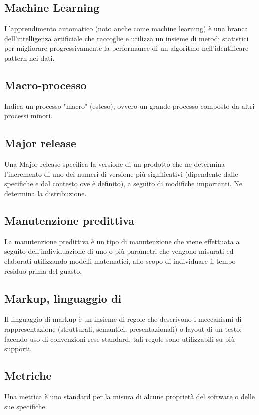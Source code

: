 
\subsection*{Machine Learning}
L’apprendimento automatico (noto anche come machine learning) è una branca dell'intelligenza artificiale che raccoglie e utilizza un insieme di metodi statistici per migliorare progressivamente la performance di un algoritmo nell'identificare pattern nei dati.

\subsection*{Macro-processo}
Indica un processo "macro" (esteso), ovvero un grande processo composto da altri processi minori.

\subsection*{Major release}
Una Major release specifica la versione di un prodotto che ne determina l’incremento di uno dei numeri di versione più significativi (dipendente dalle specifiche e dal contesto ove è definito), a seguito di modifiche importanti. Ne determina la distribuzione.

\subsection*{Manutenzione predittiva}
La manutenzione predittiva è un tipo di manutenzione che viene effettuata a seguito dell'individuazione di uno o più parametri che vengono misurati ed elaborati utilizzando modelli matematici, allo scopo di individuare il tempo residuo prima del guasto.

\subsection*{Markup, linguaggio di}
Il linguaggio di markup è un insieme di regole che descrivono i meccanismi di rappresentazione (strutturali, semantici, presentazionali) o layout di un testo; facendo uso di convenzioni rese standard, tali regole sono utilizzabili su più supporti.

\subsection*{Metriche}
Una metrica è uno standard per la misura di alcune proprietà del software o delle sue specifiche.

